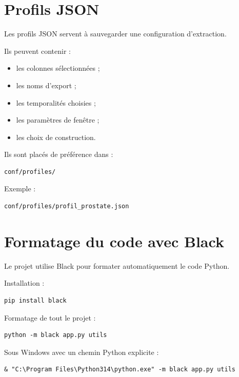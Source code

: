 \documentclass[11pt,a4paper]{article}
\begin{document}
\section{Profils JSON}

Les profils JSON servent à sauvegarder une configuration d'extraction.

Ils peuvent contenir :

\begin{itemize}
    \item les colonnes sélectionnées ;
    \item les noms d'export ;
    \item les temporalités choisies ;
    \item les paramètres de fenêtre ;
    \item les choix de construction.
\end{itemize}

Ils sont placés de préférence dans :

\begin{lstlisting}
conf/profiles/
\end{lstlisting}

Exemple :

\begin{lstlisting}
conf/profiles/profil_prostate.json
\end{lstlisting}

\section{Formatage du code avec Black}

Le projet utilise Black pour formater automatiquement le code Python.

Installation :

\begin{lstlisting}
pip install black
\end{lstlisting}

Formatage de tout le projet :

\begin{lstlisting}
python -m black app.py utils
\end{lstlisting}

Sous Windows avec un chemin Python explicite :

\begin{lstlisting}
& "C:\Program Files\Python314\python.exe" -m black app.py utils
\end{lstlisting}
\end{document}
